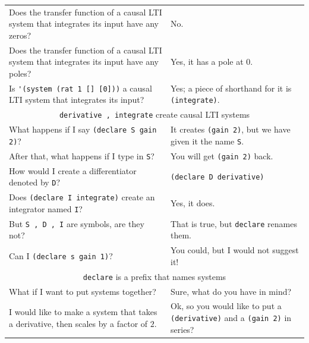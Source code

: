 \documentclass[11pt,letter]{article}
\begin{document}
\begin{longtable}{ p{} p{} }
  Does the transfer function of a causal LTI system that integrates its input have any zeros?
  &
  No. \\

  Does the transfer function of a causal LTI system that integrates its input have any poles?
  &
  Yes, it has a pole at $0$. \\

  Is \lstinline!'(system (rat 1 [] [0]))! a causal LTI system that integrates its input?
  &
  Yes; a piece of shorthand for it is \lstinline!(integrate)!. \\

  \midrule

  \multicolumn{2}{c}{\Large\lstinline!derivative , integrate! create causal LTI systems} \\

  \midrule

  What happens if I say \lstinline!(declare S gain 2)!?
  &
  It creates \lstinline!(gain 2)!, but we have given it the name \lstinline!S!. \\

  After that, what happens if I type in \lstinline!S!?
  &
  You will get \lstinline!(gain 2)! back. \\

  How would I create a differentiator denoted by \lstinline!D!?
  &
  \lstinline!(declare D derivative)! \\

  Does \lstinline!(declare I integrate)! create an integrator named \lstinline!I!?
  &
  Yes, it does. \\

  But \lstinline!S , D , I! are symbols, are they not?
  &
  That is true, but \lstinline!declare! renames them. \\

  Can I \lstinline!(declare s gain 1)!?
  &
  You could, but I would not suggest it! \\

  \midrule

  \multicolumn{2}{c}{\Large\lstinline!declare! is a prefix that names systems} \\

  \midrule

  What if I want to put systems together?
  &
  Sure, what do you have in mind? \\

  I would like to make a system that takes a derivative, then scales by a factor of $2$.
  &
  Ok, so you would like to put a \lstinline!(derivative)! and a \lstinline!(gain 2)! in series? \\


\end{longtable}
\end{document}
